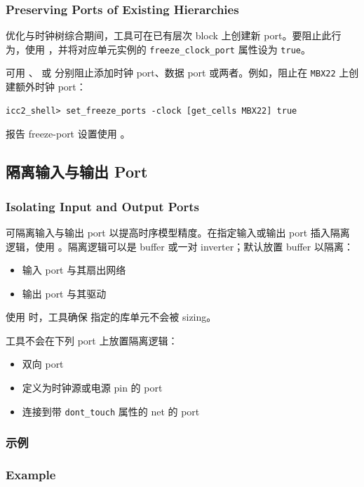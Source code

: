 \subsubsection*{Preserving Ports of Existing Hierarchies}

优化与时钟树综合期间，工具可在已有层次 block 上创建新 port。要阻止此行为，使用 ，并将对应单元实例的 \texttt{freeze\_clock\_port} 属性设为 \texttt{true}。

可用 、 或  分别阻止添加时钟 port、数据 port 或两者。例如，阻止在 \texttt{MBX22} 上创建额外时钟 port：
\begin{lstlisting}
icc2_shell> set_freeze_ports -clock [get_cells MBX22] true
\end{lstlisting}

报告 freeze-port 设置使用 。

\subsection{隔离输入与输出 Port}
\subsubsection*{Isolating Input and Output Ports}

可隔离输入与输出 port 以提高时序模型精度。在指定输入或输出 port 插入隔离逻辑，使用 。隔离逻辑可以是 buffer 或一对 inverter；默认放置 buffer 以隔离：
\begin{itemize}
  \item 输入 port 与其扇出网络
  \item 输出 port 与其驱动
\end{itemize}

使用  时，工具确保  指定的库单元不会被 sizing。

工具不会在下列 port 上放置隔离逻辑：
\begin{itemize}
  \item 双向 port
  \item 定义为时钟源或电源 pin 的 port
  \item 连接到带 \texttt{dont\_touch} 属性的 net 的 port
\end{itemize}

\subsubsection{示例}
\subsubsection*{Example}

